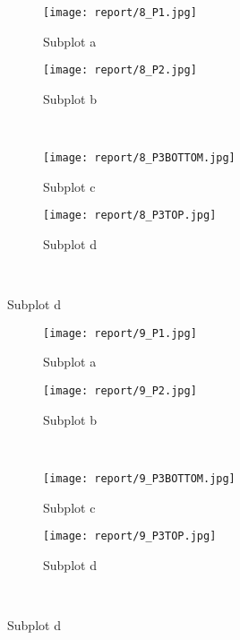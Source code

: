 \documentclass{article}%
\begin{document}
\begin{figure}[h!]%
\caption{9HAFTERSTARTFIRE}%
\centering%
\begin{subfigure}{0.45\textwidth}%
\texttt{[image:  report/8\_P1.jpg]}%
\caption{Subplot a}%
\end{subfigure}%
\begin{subfigure}{0.45\textwidth}%
\texttt{[image:  report/8\_P2.jpg]}%
\caption{Subplot b}%
\end{subfigure}%
\\%
\begin{subfigure}{0.45\textwidth}%
\texttt{[image:  report/8\_P3BOTTOM.jpg]}%
\caption{Subplot c}%
\end{subfigure}%
\begin{subfigure}{0.45\textwidth}%
\texttt{[image:  report/8\_P3TOP.jpg]}%
\caption{Subplot d}%
\end{subfigure}%
\\%
\end{figure}

%


\begin{figure}[h!]%
\caption{10HAFTERSTARTFIRE}%
\centering%
\begin{subfigure}{0.45\textwidth}%
\texttt{[image:  report/9\_P1.jpg]}%
\caption{Subplot a}%
\end{subfigure}%
\begin{subfigure}{0.45\textwidth}%
\texttt{[image:  report/9\_P2.jpg]}%
\caption{Subplot b}%
\end{subfigure}%
\\%
\begin{subfigure}{0.45\textwidth}%
\texttt{[image:  report/9\_P3BOTTOM.jpg]}%
\caption{Subplot c}%
\end{subfigure}%
\begin{subfigure}{0.45\textwidth}%
\texttt{[image:  report/9\_P3TOP.jpg]}%
\caption{Subplot d}%
\end{subfigure}%
\\%
\end{figure}

%
\end{document}
